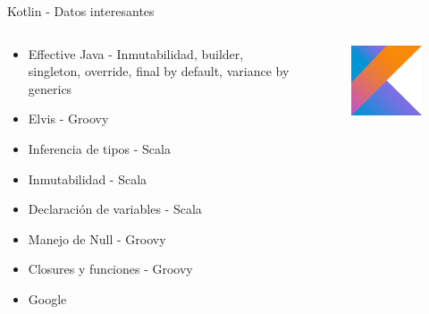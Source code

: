 \documentclass{beamer}
\begin{document}
\begin{frame}{Kotlin - Datos interesantes}
\begin{columns}
	\begin{column}{0.5\textwidth}
		\begin{itemize}
			\item Effective Java - Inmutabilidad, builder, singleton, override, final by default, variance by generics
			\item Elvis - Groovy 
			\item Inferencia de tipos - Scala
			\item Inmutabilidad - Scala
			\item Declaración de variables - Scala
			\item Manejo de Null - Groovy
			\item Closures y funciones - Groovy
			\item Google
		\end{itemize}
	\end{column}
	\begin{column}{0.5\textwidth}  %
		\begin{figure}
			\centering
			\includegraphics[width=0.7\linewidth]{Images/kotlin}
		\end{figure}
	\end{column}
\end{columns}
\end{frame}
\end{document}
